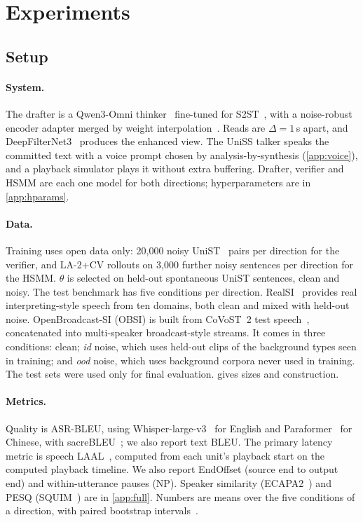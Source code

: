 \section{Experiments}
\label{sec:exp}

\subsection{Setup}
\label{sec:setup}

\paragraph{System.}
The drafter is a Qwen3-Omni thinker~\citep{xu2025qwen3omni} fine-tuned for S2ST~\citep{uniss2025}, with a noise-robust encoder adapter merged by weight interpolation~\citep{wortsman2022robust}.
Reads are $\Delta = 1$\,s apart, and DeepFilterNet3~\citep{schroeter2023deepfilternet} produces the enhanced view.
The UniSS talker speaks the committed text with a voice prompt chosen by analysis-by-synthesis (\cref{app:voice}), and a playback simulator plays it without extra buffering.
Drafter, verifier and HSMM are each one model for both directions; hyperparameters are in \cref{app:hparams}.

\paragraph{Data.}
Training uses open data only: 20{,}000 noisy UniST~\citep{uniss2025} pairs per direction for the verifier, and LA-2+CV rollouts on 3{,}000 further noisy sentences per direction for the HSMM.
$\theta$ is selected on held-out spontaneous UniST sentences, clean and noisy.
The test benchmark has five conditions per direction.
RealSI~\citep{cheng2024realsi} provides real interpreting-style speech from ten domains, both clean and mixed with held-out noise.
OpenBroadcast-SI (OBSI) is built from CoVoST~2 test speech~\citep{wang2020covost2}, concatenated into multi-speaker broadcast-style streams.
It comes in three conditions: clean; \emph{id} noise, which uses held-out clips of the background types seen in training; and \emph{ood} noise, which uses background corpora never used in training.
The test sets were used only for final evaluation.
 gives sizes and construction.

\paragraph{Metrics.}
Quality is ASR-BLEU, using Whisper-large-v3~\citep{radford2023robust} for English and Paraformer~\citep{gao2023funasr} for Chinese, with sacreBLEU~\citep{post2018call}; we also report text BLEU.
The primary latency metric is speech LAAL~\citep{papi2022over}, computed from each unit's playback start on the computed playback timeline.
We also report EndOffset (source end to output end) and within-utterance pauses (NP).
Speaker similarity (ECAPA2~\citep{thienpondt2023ecapa2}) and PESQ (SQUIM~\citep{kumar2023squim}) are in \cref{app:full}.
Numbers are means over the five conditions of a direction, with paired bootstrap intervals~\citep{koehn2004statistical}.


